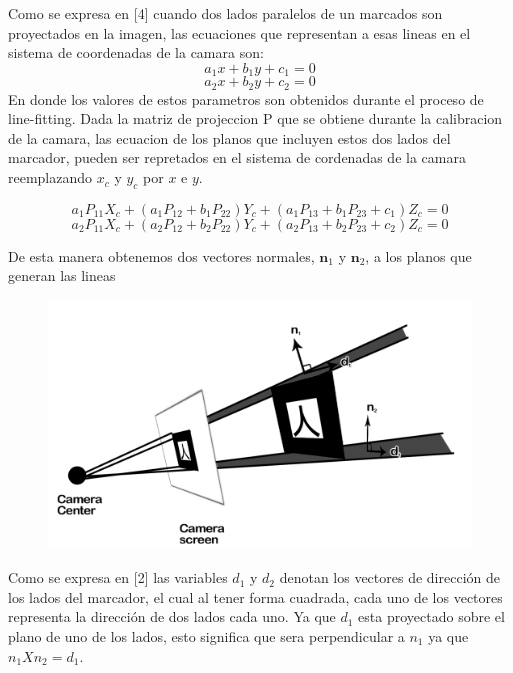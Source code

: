 \documentclass[runningheads]{llncs}
\begin{document}
	Como se expresa en [4] cuando dos lados paralelos de un marcados son proyectados en la imagen, las ecuaciones que representan a esas lineas en el sistema de coordenadas de la camara son:
	\begin{equation}
	a_{1}x+b_1y + c_1 = 0
	\end{equation}
	\begin{equation}
	a_{2}x+b_2y + c_2 = 0
	\end{equation}
	En donde los valores de estos parametros son obtenidos durante el proceso de line-fitting. Dada la matriz de projeccion P que se obtiene durante la calibracion de la camara, las ecuacion de los planos que incluyen estos dos lados del marcador, pueden ser repretados en el sistema de cordenadas de la camara reemplazando $x_c$ y $y_c$ por $x$ e $y$.
	
	\begin{equation}
	a_1P_{11}X_c + (a_1P_{12}+ b_1P_{22})Y_c + (a_1P_{13}+ b_1P_{23}+ c_1)Z_c = 0
	\end{equation}
	\begin{equation}
	a_2P_{11}X_c + (a_2P_{12}+ b_2P_{22})Y_c + (a_2P_{13}+ b_2P_{23}+ c_2)Z_c = 0
	\end{equation}
	
	De esta manera obtenemos dos vectores normales, $ \textbf{n}_{1} $ y $ \textbf{n}_{2} $, a los planos que generan las lineas
	
	\begin{figure}
		\centering
		\includegraphics[width=0.7\linewidth]{Imagenes/ar-normales}
		\caption{}
		\label{fig:ar-normales}
	\end{figure}
	
	Como se expresa en [2] las variables $d_1$ y $ d_2 $ denotan los vectores de dirección de los lados del marcador, el cual al tener forma cuadrada, cada uno de los vectores representa la dirección de dos lados cada uno. Ya que $ d_1 $ esta proyectado sobre el plano de uno de los lados, esto significa que sera perpendicular a $ n_1 $ ya que $ n_1 X n_2 = d_1 $.
	
\end{document}
